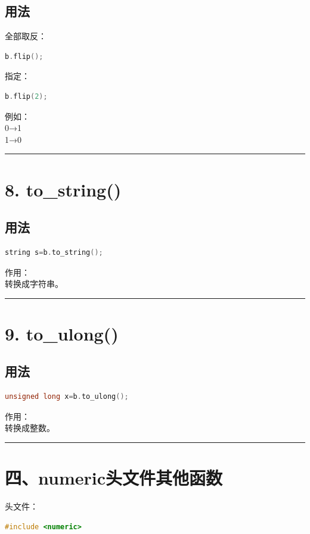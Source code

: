 \documentclass[9pt,twocolumn]{extarticle}
\begin{document}
\subsection{用法}
全部取反：
\begin{lstlisting}[language=C++]
b.flip();
\end{lstlisting}
指定：
\begin{lstlisting}[language=C++]
b.flip(2);
\end{lstlisting}
例如：\\
0→1\\
1→0

\noindent\rule{\linewidth}{0.4pt}

\section{8. to\_string()}

\subsection{用法}
\begin{lstlisting}[language=C++]
string s=b.to_string();
\end{lstlisting}
作用：\\
转换成字符串。

\noindent\rule{\linewidth}{0.4pt}

\section{9. to\_ulong()}

\subsection{用法}
\begin{lstlisting}[language=C++]
unsigned long x=b.to_ulong();
\end{lstlisting}
作用：\\
转换成整数。

\noindent\rule{\linewidth}{0.4pt}

\section{四、numeric头文件其他函数}

头文件：
\begin{lstlisting}[language=C++]
#include <numeric>
\end{lstlisting}
\end{document}

